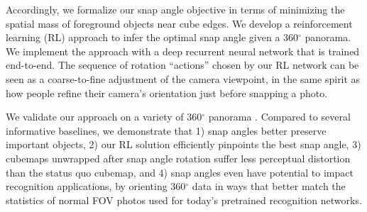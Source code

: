 Accordingly, we formalize our snap angle objective in terms of minimizing the spatial mass of foreground objects near cube edges.  We develop a reinforcement learning (RL) approach to infer the optimal snap angle given a 360$^{\circ}$ panorama.  We implement the approach with a deep recurrent neural network that is trained end-to-end.  The sequence of rotation ``actions'' chosen by our RL network can be seen as a  coarse-to-fine adjustment of the camera viewpoint, in the same spirit as how people refine their camera's orientation just before snapping a photo.




 



We validate our approach on a variety of 360${^\circ}$ panorama .  Compared to several informative baselines, we demonstrate that  1) snap angles better preserve important objects, 2) our RL solution efficiently pinpoints the best snap angle, 3) cubemaps unwrapped after snap angle rotation suffer less perceptual distortion than the status quo cubemap, and 4) snap angles even have potential to impact recognition applications, by orienting 360$^{\circ}$ data in ways that better match the statistics of normal FOV photos used for today's pretrained recognition networks.








